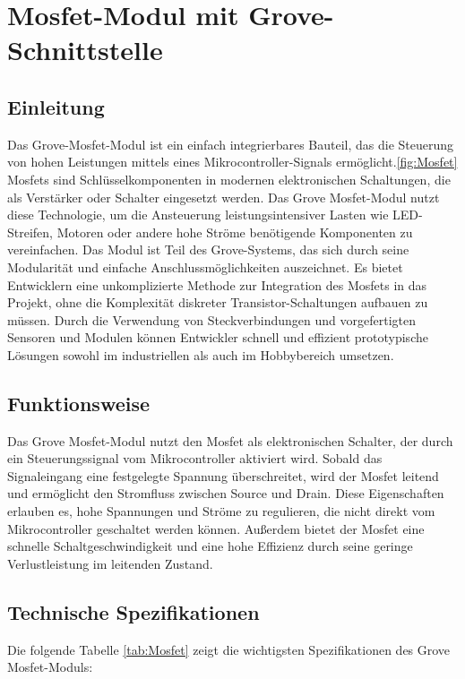 
\chapter{Mosfet-Modul mit Grove-Schnittstelle}\label{GroveMosfet-Modul}

\section{Einleitung}
Das Grove-Mosfet-Modul ist ein einfach integrierbares Bauteil, das die Steuerung von hohen Leistungen mittels eines Mikrocontroller-Signals ermöglicht.\ref{fig:Mosfet} Mosfets sind Schlüsselkomponenten in modernen elektronischen Schaltungen, die als Verstärker oder Schalter eingesetzt werden. Das Grove Mosfet-Modul nutzt diese Technologie, um die Ansteuerung leistungsintensiver Lasten wie LED-Streifen, Motoren oder andere hohe Ströme benötigende Komponenten zu vereinfachen.
Das Modul ist Teil des Grove-Systems, das sich durch seine Modularität und einfache Anschlussmöglichkeiten auszeichnet. Es bietet Entwicklern eine unkomplizierte Methode zur Integration des Mosfets in das Projekt, ohne die Komplexität diskreter Transistor-Schaltungen aufbauen zu müssen. Durch die Verwendung von Steckverbindungen und vorgefertigten Sensoren und Modulen können Entwickler schnell und effizient prototypische Lösungen sowohl im industriellen als auch im Hobbybereich umsetzen.
\cite{GroveGuide2023}

\section{Funktionsweise}
Das Grove Mosfet-Modul nutzt den Mosfet als elektronischen Schalter, der durch ein Steuerungssignal vom Mikrocontroller aktiviert wird. Sobald das Signaleingang eine festgelegte Spannung überschreitet, wird der Mosfet leitend und ermöglicht den Stromfluss zwischen Source und Drain. Diese Eigenschaften erlauben es, hohe Spannungen und Ströme zu regulieren, die nicht direkt vom Mikrocontroller geschaltet werden können. Außerdem bietet der Mosfet  eine schnelle Schaltgeschwindigkeit und eine hohe Effizienz durch seine geringe Verlustleistung im leitenden Zustand.
\cite{MOSFETApplication2018}

\section{Technische Spezifikationen}
Die folgende Tabelle \ref{tab:Mosfet} zeigt die wichtigsten Spezifikationen des Grove Mosfet-Moduls:


